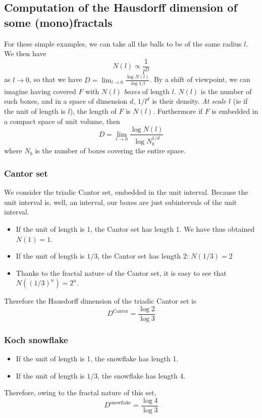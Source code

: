 \documentclass[11pt]{article}
\begin{document}
\subsection{Computation of the Hausdorff dimension of some (mono)fractals}
For these simple examples, we can take all the balls to be of the same radius $l$. We then have
\begin{equation}
	N(l) \propto \frac{1}{l^D}
\end{equation}
as $l \rightarrow 0$, so that we have $D = \lim_{l\rightarrow 0} \frac{\log N(l)}{\log 1/l}$. 
By a shift of viewpoint, we can imagine having covered $F$ with $N(l)$ \emph{boxes} of length $l$. $N(l)$ is the number of such boxes, and in a space of dimension $d$, $1/l^d$ is their density. \emph{At scale $l$} (ie if the unit of length is $l$), the length of $F$ is $N(l)$. Furthermore if $F$ is embedded in a compact space of unit volume, then 
\begin{equation}
	D = \lim_{l\rightarrow 0} \frac{\log N(l)}{\log N_b^{1/d}}
\end{equation}
where $N_b$ is the number of boxes covering the entire space.

\subsubsection{Cantor set}
We consider the triadic Cantor set, embedded in the unit interval. Because the unit interval is, well, an interval, our boxes are just subintervals of the unit interval.

\begin{itemize}
	\item If the unit of length is 1, the Cantor set has length 1. We have thus obtained $N(1) = 1$.
	\item If the unit of length is $1/3$, the Cantor set has length $2$: $N(1/3) = 2$
	\item Thanks to the fractal nature of the Cantor set, it is easy to see that $N((1/3)^n) = 2^n$.
\end{itemize}
Therefore the Hausdorff dimension of the triadic Cantor set is
\begin{equation}
	D^{\text{Cantor}} = \frac{\log 2}{\log 3}
\end{equation}

\subsubsection{Koch snowflake}

\begin{itemize}
	\item If the unit of length is 1, the snowflake has length 1.
	\item If the unit of length is $1/3$, the snowflake has length 4.
\end{itemize}
Therefore, owing to the fractal nature of this set,
\begin{equation}
	D^{\text{snowflake}} = \frac{\log 4}{\log 3}
\end{equation}
\end{document}
